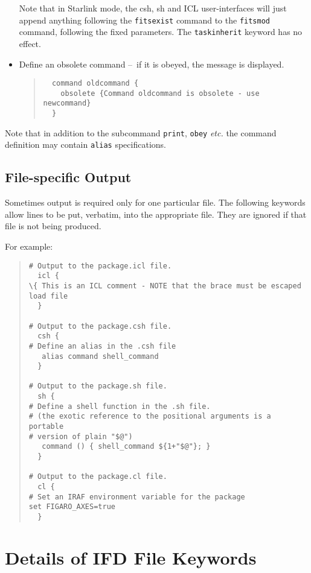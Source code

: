 \documentclass[twoside,11pt]{article}
\newcommand{\xlabel}[1]{}
\newcommand{\dash}{--}
\newcommand{\dash}{-}
\begin{document}
\begin{itemize}
Note that in Starlink mode, the csh, sh and ICL user-interfaces will just
append anything following the \texttt{fitsexist} command to the
\texttt{fitsmod} command, following the fixed parameters. The
\texttt{taskinherit} keyword has no effect.
\item Define an obsolete command \dash\ if it is obeyed, the message is
displayed.
\begin{quote} \begin{verbatim}
  command oldcommand {
    obsolete {Command oldcommand is obsolete - use newcommand}
  }
\end{verbatim} \end{quote}
\end{itemize}

Note that in addition to the subcommand \texttt{print}, \texttt{obey}
\textit{etc.} the command definition may contain \texttt{alias}
specifications.

\subsection{\xlabel{filespecific_output}File-specific Output}
Sometimes output is required only for one particular file. The following
keywords allow lines to be put, verbatim, into the appropriate file.
They are ignored if that file is not being produced.

For example:

\begin{quote} \begin{verbatim}
# Output to the package.icl file.
  icl {
\{ This is an ICL comment - NOTE that the brace must be escaped
load file
  }

# Output to the package.csh file.
  csh {
# Define an alias in the .csh file
   alias command shell_command
  }

# Output to the package.sh file.
  sh {
# Define a shell function in the .sh file.
# (the exotic reference to the positional arguments is a portable
# version of plain "$@")
   command () { shell_command ${1+"$@"}; }
  }

# Output to the package.cl file.
  cl {
# Set an IRAF environment variable for the package
set FIGARO_AXES=true
  }
\end{verbatim} \end{quote}

\newpage
\section{\xlabel{details_of_ifd_file_keywords}\label{keywords}Details of IFD
File Keywords}
\end{document}
